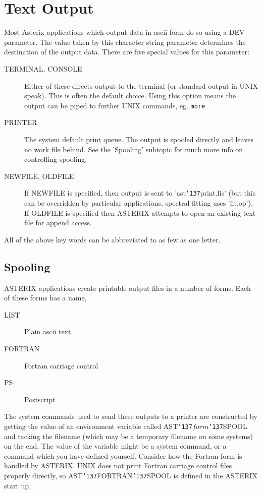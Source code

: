 \documentclass{book}
\renewcommand{\_}{{\tt\char'137}}     %
\begin{document}
\section{Text Output}
Most Asterix applications which output data in ascii form do so using
a DEV parameter. The value taken by this character string parameter
determines the destination of the output data. There are five special
values for this parameter:


\begin{description}
\item[TERMINAL, CONSOLE]
Either of these directs output to the terminal (or standard output
in UNIX speak). This is often the default choice. Using this
option means the output can be piped to
further UNIX commands, eg. {\tt more}
\item[PRINTER]
The system default print queue. The output
is spooled directly and leaves no work file
behind. See the 'Spooling' subtopic for
much more info on controlling spooling.
\item[NEWFILE, OLDFILE]
If NEWFILE is specified, then output is sent
to 'ast\_print.lis' (but this can be overridden by
particular applications, spectral
fitting uses 'fit.op'). If OLDFILE is
specified then ASTERIX attempts to open an
existing text file for append access.
\end{description}
All of the above key words can be abbreviated to as few as one letter.

\subsection{Spooling}
ASTERIX applications create printable output files in a number of
forms. Each of these forms has a name,


\begin{description}
\item[LIST]
Plain ascii text
\item[FORTRAN]
Fortran carriage control
\item[PS]
Postscript
\end{description}
The system commands used to send these outputs to a printer are
constructed by getting the value of an environment variable called
AST\_$form$\_SPOOL and tacking the filename (which may be a temporary
filename on some systems) on the end. The value of the variable
might be a system command, or a command which you have defined
yourself. Consider how the Fortran form is handled by ASTERIX. UNIX
does not print Fortran carriage control files properly directly, so
AST\_FORTRAN\_SPOOL is defined in the ASTERIX start up,
\end{document}
